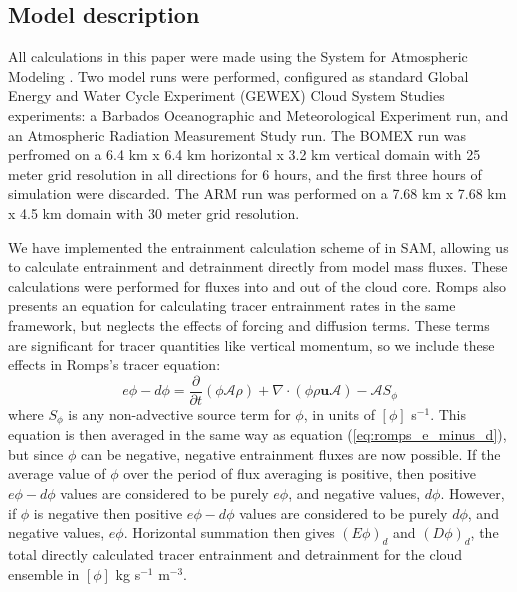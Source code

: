 \documentclass[draft,grl]{agutex}
\begin{document}
\begin{article}

\section{Model description}

All calculations in this paper were made using the System for Atmospheric 
Modeling \citep[SAM;][]{Khairoutdinov2003}.  Two model runs were performed, 
configured as standard Global Energy and Water Cycle Experiment (GEWEX) 
Cloud System Studies \citep[GCSS;][]{Randall2003} experiments: a Barbados 
Oceanographic and Meteorological Experiment \citep[BOMEX;][]{Siebesma2003} run,
and an Atmospheric Radiation Measurement Study \citep[ARM;][]{Brown2002} run. 
The BOMEX run was perfromed on a 6.4 km x 6.4 km horizontal x 3.2 km vertical 
domain with 25 meter grid resolution in all directions for 6 hours, and the 
first three hours of simulation were discarded. The ARM run was performed on a 
7.68 km x 7.68 km x 4.5 km domain with 30 meter grid resolution.

We have implemented the entrainment calculation scheme of \cite{Romps2010} in 
SAM, allowing us to calculate entrainment and detrainment directly from model 
mass fluxes.  These calculations were performed for fluxes into and out of the 
cloud core.  Romps also presents an equation for calculating tracer entrainment 
rates in the same framework, but neglects the effects of forcing and diffusion 
terms.  These terms are significant for tracer quantities like vertical 
momentum, so we include these effects in Romps's tracer equation:
\begin{equation}
  \label{eq:romps_ephi_minus_dphi}
  e\phi - d\phi = \frac{\partial}{\partial t}(\phi \mathcal{A} \rho) 
                + \nabla \cdot (\phi \rho \mathbf{u} \mathcal{A})
                - \mathcal{A}S_\phi
\end{equation}
where $S_\phi$ is any non-advective source term for $\phi$, in units of 
$[\phi]$ s$^{-1}$.  This equation is then averaged in the same way as equation 
(\ref{eq:romps_e_minus_d}), but since $\phi$ can be negative, negative 
entrainment fluxes are now possible.  If the average value of $\phi$ over the 
period of flux averaging is positive, then positive $e\phi-d\phi$ values are 
considered to be purely $e\phi$, and negative values, $d\phi$.  However, if 
$\phi$ is negative then positive $e\phi-d\phi$ values are considered to be 
purely $d\phi$, and negative values, $e\phi$.  Horizontal summation then gives 
$(E\phi)_d$ and $(D\phi)_d$, the total directly calculated tracer entrainment 
and detrainment for the cloud ensemble in $[\phi]$ kg s$^{-1}$ m$^{-3}$.


\end{article}
\end{document}
